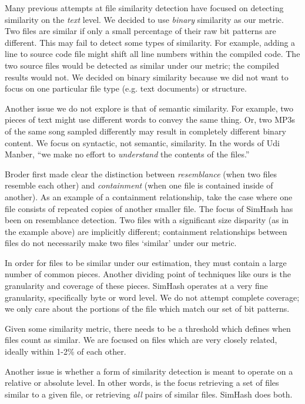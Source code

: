 \documentclass[10pt, twocolumn]{article}
\begin{document}
Many previous attempts at file similarity detection have focused on detecting similarity on the \emph{text} \cite{hpDocRepositories, hoad} level. We decided to use \emph{binary} similarity as our metric. Two files are similar if only a small percentage of their raw bit patterns are different. This may fail to detect some types of similarity.  For example, adding a line to source code file might shift all line numbers within the compiled code.  The two source files would be detected as similar under our metric; the compiled results would not.  We decided on binary similarity because we did not want to focus on one particular file type (e.g. text documents) or structure. 

Another issue we do not explore is that of semantic similarity. For example, two pieces of text might use different words to convey the same thing. Or, two MP3s of the same song sampled differently may result in completely different binary content.  We focus on syntactic, not semantic, similarity. In the words of Udi Manber, ``we make no effort to \emph{understand} the contents of the files.'' \cite{manber}

Broder \cite{broder} first made clear the distinction between \emph{resemblance} (when two files resemble each other) and \emph{containment} (when one file is contained inside of another). As an example of a containment relationship, take the case where one file consists of repeated copies of another smaller file. The focus of SimHash has been on resemblance detection. Two files with a significant size disparity (as in the example above) are implicitly different; containment relationships between files do not necessarily make two files `similar' under our metric.

In order for files to be similar under our estimation, they must contain a large number of common pieces. Another dividing point of techniques like ours is the granularity and coverage of these pieces. SimHash operates at a very fine granularity, specifically byte or word level. We do not attempt complete coverage; we only care about the portions of the file which match our set of bit patterns.

Given some similarity metric, there needs to be a threshold which defines when files count as similar. We are focused on files which are very closely related, ideally within 1-2\% of each other.

Another issue is whether a form of similarity detection is meant to operate on a relative or absolute level. In other words, is the focus retrieving a set of files similar to a given file, or retrieving \emph{all} pairs of similar files. SimHash does both.
\end{document}
